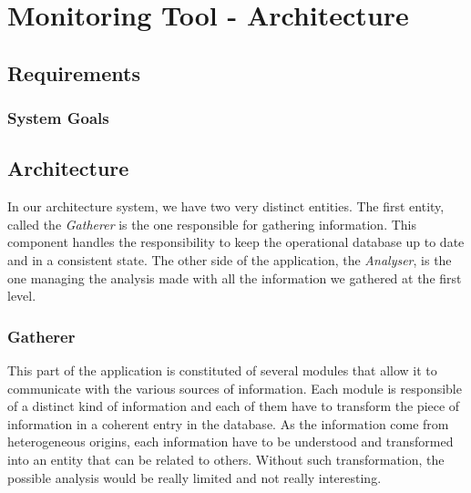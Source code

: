 
\chapter{Monitoring Tool - Architecture} %

\label{Chapter4} %

\section{Requirements}
\subsection{System Goals}

\section{Architecture}
In our architecture system, we have two very distinct entities. 
The first entity, called the \textit{Gatherer} is the one responsible for gathering information. This component handles the responsibility to keep the operational database up to date and in a consistent state. The other side of the application, the \textit{Analyser}, is the one managing the analysis made with all the information we gathered at the first level.

\subsection{Gatherer}
This part of the application is constituted of several modules that allow it to communicate with the various sources of information. Each module is responsible of a distinct kind of information and each of them have to transform the piece of information in a coherent entry in the database. As the information come from heterogeneous origins, each information have to be understood and transformed into an entity that can be related to others. Without such transformation, the possible analysis would be really limited and not really interesting.

